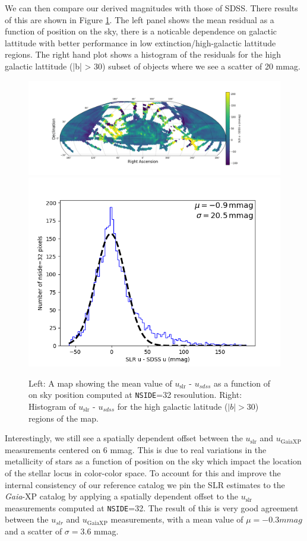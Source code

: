 We can then compare our derived magnitudes with those of SDSS. There results of this are shown in Figure \ref{fig:slr_sdss_compare}. The left panel shows the mean residual as a function of position on the sky, there is a noticable dependence on galactic lattitude with better performance in low extinction/high-galactic lattitude regions. The right hand plot shows a histogram of the residuals for the high galactic lattitude (|b| > 30) subset of objects where we see a scatter of 20 mmag.  
\begin{figure}
    \includegraphics[width=0.64\linewidth]{./figures/u-band/uslr/uslr-usdss_full_map.png}
    \includegraphics[width=0.32\linewidth]{./figures/u-band/uslr/uslr-usdss_highglat_hist.png}

    \label{fig:slr_sdss_compare}
    \caption{
    Left: A map showing the mean value of $u_{\mathrm{slr}}$ - $u_{sdss}$ as a function of on sky position computed at \texttt{NSIDE}=32 resoulution.  
    Right: Histogram of $u_{\mathrm{slr}}$ - $u_{sdss}$ for the high galactic latitude ($|b| > 30$) regions of the map. }
\end{figure}

Interestingly, we still see a spatially dependent offset between the $u_{\mathrm{slr}}$ and $u_{\mathrm{GaiaXP}}$ measurements centered on 6 mmag.
This is due to real variations in the metallicity of stars as a function of position on the sky which impact the location of the stellar locus in color-color space.
To account for this and improve the internal consistency of our reference catalog we pin the SLR estimates to the \emph{Gaia}-XP catalog by applying a spatially dependent offset to the $u_{\mathrm{slr}}$ measurements computed at \texttt{NSIDE}=32.
The result of this is very good agreement between the $u_{slr}$ and $u_{\mathrm{GaiaXP}}$ measurements, with a mean value of $\mu = -0.3 mmag$ and a scatter of $\sigma = 3.6$ mmag. 

